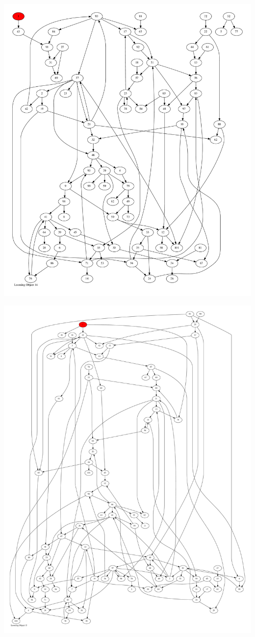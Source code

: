 \documentclass{article}
\begin{document}
\newpage
\includegraphics[max height=\textheight,max width=\textwidth]{looming_object/loom_obj14_pp.pdf}

\newpage
\includegraphics[max height=\textheight,max width=\textwidth]{looming_object/loom_obj15_pp.pdf}
\end{document}
